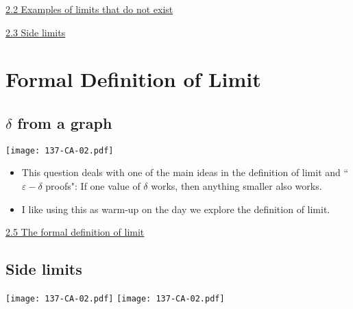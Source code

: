 \documentclass[11pt]{article}
\newcommand{\n}{\newpage}
\newcommand{\e}{\varepsilon}
\newcommand{\nl}{\hfill \vspace{-1.1\baselineskip}} %
\newcommand{\vii}{\hspace{8mm} \href{https://www.youtube.com/watch?v=bo2YmvSaTNI&list=PLlwePzQY_wW8P_I8BFgm0-upywEwTKd8_&index=3&t=0s}{2.2 Examples of limits that do not exist}}
\newcommand{\viii}{\hspace{8mm} \href{https://www.youtube.com/watch?v=299WBtK_qro&list=PLlwePzQY_wW8P_I8BFgm0-upywEwTKd8_&index=3}{2.3 Side limits}}
\newcommand{\vv}{\hspace{8mm} \href{https://www.youtube.com/watch?v=eCBM1tVHDqo&list=PLlwePzQY_wW8P_I8BFgm0-upywEwTKd8_&index=5}{2.5 The formal definition of limit}}
\begin{document}
\begin{videos}
\vii

\viii
\end{videos}

\n
\newpage
\section{Formal Definition of Limit}
\subsection{$\delta$ from a graph} 

\begin{center}
{ \texttt{[image: 137-CA-02.pdf]}}
\end{center}

\begin{comments}
\nl
	\begin{itemize}
		\item  This question deals with one of the main ideas in the definition of limit and ``$\e-\delta$ proofs":  If one value of $\delta$ works, then anything smaller also works.
		\item I like using this as warm-up on the day we explore the definition of limit.
	\end{itemize}
\end{comments}

\begin{videos}
\vv
\end{videos}

\n
\newpage
\subsection{Side limits} 

\begin{center}
{ \texttt{[image: 137-CA-02.pdf]}}
\quad
{ \texttt{[image: 137-CA-02.pdf]}}
\end{center}
\end{document}

